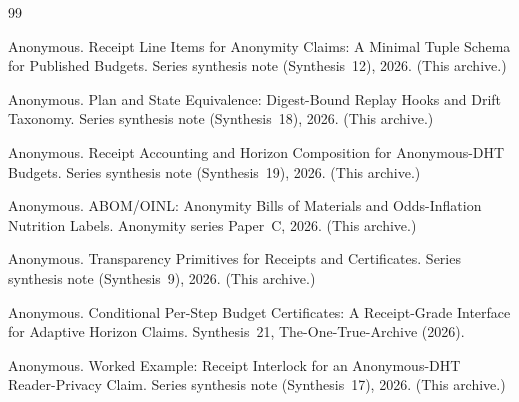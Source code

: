 \documentclass[11pt]{article}
\begin{document}
\begin{thebibliography}{99}\small

Anonymous.
\newblock Receipt Line Items for Anonymity Claims: A Minimal Tuple Schema for Published Budgets.
\newblock Series synthesis note (Synthesis~12), 2026. (This archive.)

Anonymous.
\newblock Plan and State Equivalence: Digest-Bound Replay Hooks and Drift Taxonomy.
\newblock Series synthesis note (Synthesis~18), 2026. (This archive.)

Anonymous.
\newblock Receipt Accounting and Horizon Composition for Anonymous-DHT Budgets.
\newblock Series synthesis note (Synthesis~19), 2026. (This archive.)

Anonymous.
\newblock ABOM/OINL: Anonymity Bills of Materials and Odds-Inflation Nutrition Labels.
\newblock Anonymity series Paper~C, 2026. (This archive.)

Anonymous.
\newblock Transparency Primitives for Receipts and Certificates.
\newblock Series synthesis note (Synthesis~9), 2026. (This archive.)

Anonymous.
\newblock Conditional Per-Step Budget Certificates: A Receipt-Grade Interface for Adaptive Horizon Claims.
\newblock Synthesis~21, The-One-True-Archive (2026).

Anonymous.
\newblock Worked Example: Receipt Interlock for an Anonymous-DHT Reader-Privacy Claim.
\newblock Series synthesis note (Synthesis~17), 2026. (This archive.)

\end{thebibliography}
\end{document}
